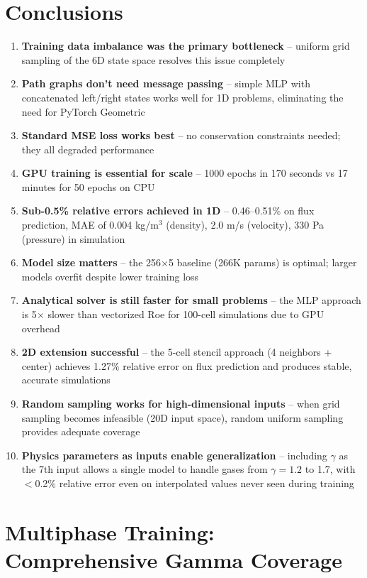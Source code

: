 \documentclass[11pt,a4paper]{article}
\begin{document}
\section{Conclusions}

\begin{enumerate}
    \item \textbf{Training data imbalance was the primary bottleneck} -- uniform grid sampling of the 6D state space resolves this issue completely
    \item \textbf{Path graphs don't need message passing} -- simple MLP with concatenated left/right states works well for 1D problems, eliminating the need for PyTorch Geometric
    \item \textbf{Standard MSE loss works best} -- no conservation constraints needed; they all degraded performance
    \item \textbf{GPU training is essential for scale} -- 1000 epochs in 170 seconds vs 17 minutes for 50 epochs on CPU
    \item \textbf{Sub-0.5\% relative errors achieved in 1D} -- 0.46--0.51\% on flux prediction, MAE of 0.004 kg/m$^3$ (density), 2.0 m/s (velocity), 330 Pa (pressure) in simulation
    \item \textbf{Model size matters} -- the 256$\times$5 baseline (266K params) is optimal; larger models overfit despite lower training loss
    \item \textbf{Analytical solver is still faster for small problems} -- the MLP approach is 5$\times$ slower than vectorized Roe for 100-cell simulations due to GPU overhead
    \item \textbf{2D extension successful} -- the 5-cell stencil approach (4 neighbors + center) achieves 1.27\% relative error on flux prediction and produces stable, accurate simulations
    \item \textbf{Random sampling works for high-dimensional inputs} -- when grid sampling becomes infeasible (20D input space), random uniform sampling provides adequate coverage
    \item \textbf{Physics parameters as inputs enable generalization} -- including $\gamma$ as the 7th input allows a single model to handle gases from $\gamma = 1.2$ to 1.7, with $<$0.2\% relative error even on interpolated values never seen during training
\end{enumerate}

\section{Multiphase Training: Comprehensive Gamma Coverage}
\end{document}
